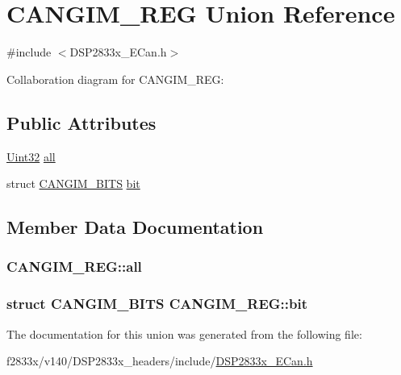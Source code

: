 \hypertarget{union_c_a_n_g_i_m___r_e_g}{}\section{C\+A\+N\+G\+I\+M\+\_\+\+R\+E\+G Union Reference}
\label{union_c_a_n_g_i_m___r_e_g}


{\ttfamily \#include $<$D\+S\+P2833x\+\_\+\+E\+Can.\+h$>$}



Collaboration diagram for C\+A\+N\+G\+I\+M\+\_\+\+R\+E\+G\+:
\subsection*{Public Attributes}
\begin{DoxyCompactItemize}
\item 
\hyperlink{_d_s_p2833x___device_8h_aba99025e657f892beb7ff31cecf64653}{Uint32} \hyperlink{union_c_a_n_g_i_m___r_e_g_a6658306a7e2f87c05e69abadf12a7043}{all}
\item 
struct \hyperlink{struct_c_a_n_g_i_m___b_i_t_s}{C\+A\+N\+G\+I\+M\+\_\+\+B\+I\+T\+S} \hyperlink{union_c_a_n_g_i_m___r_e_g_aead022760435b5d1333c2911abcadd9a}{bit}
\end{DoxyCompactItemize}


\subsection{Member Data Documentation}
\hypertarget{union_c_a_n_g_i_m___r_e_g_a6658306a7e2f87c05e69abadf12a7043}{}
\subsubsection[{all}]{ C\+A\+N\+G\+I\+M\+\_\+\+R\+E\+G\+::all}\label{union_c_a_n_g_i_m___r_e_g_a6658306a7e2f87c05e69abadf12a7043}
\hypertarget{union_c_a_n_g_i_m___r_e_g_aead022760435b5d1333c2911abcadd9a}{}
\subsubsection[{bit}]{\setlength{\rightskip}{0pt plus 5cm}struct {\bf C\+A\+N\+G\+I\+M\+\_\+\+B\+I\+T\+S} C\+A\+N\+G\+I\+M\+\_\+\+R\+E\+G\+::bit}\label{union_c_a_n_g_i_m___r_e_g_aead022760435b5d1333c2911abcadd9a}


The documentation for this union was generated from the following file\+:\begin{DoxyCompactItemize}
\item 
f2833x/v140/\+D\+S\+P2833x\+\_\+headers/include/\hyperlink{_d_s_p2833x___e_can_8h}{D\+S\+P2833x\+\_\+\+E\+Can.\+h}\end{DoxyCompactItemize}
